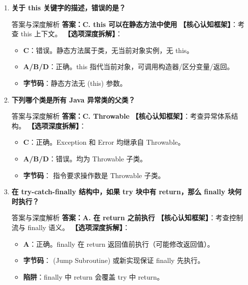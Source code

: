 ﻿\documentclass[12pt, a4paper]{ctexart}
\newcommand{\code}[1]{\texttt{\color{myblue}\detokenize{#1}}}
\begin{document}
\begin{enumerate}[label=\arabic*.]
	\item \textbf{关于 this 关键字的描述，错误的是？}
	      \begin{bluebox}{答案与深度解析}
		      \textbf{答案：C. this 可以在静态方法中使用}
		      \textbf{【核心认知框架】}：考查 this 上下文。
		      \textbf{【选项深度拆解】}：
		      \begin{itemize}[leftmargin=*, nosep]
			      \item \textbf{C}：错误。静态方法属于类，无当前对象实例，无 this。
			      \item \textbf{A/B/D}：正确。this 指代当前对象，可调用构造器/区分变量/返回。
			      \item \textbf{字节码}：静态方法无 \code{aload_0} (this) 参数。
		      \end{itemize}
	      \end{bluebox}

	\item \textbf{下列哪个类是所有 Java 异常类的父类？}
	      \begin{bluebox}{答案与深度解析}
		      \textbf{答案：C. Throwable}
		      \textbf{【核心认知框架】}：考查异常体系结构。
		      \textbf{【选项深度拆解】}：
		      \begin{itemize}[leftmargin=*, nosep]
			      \item \textbf{C}：正确。Exception 和 Error 均继承自 Throwable。
			      \item \textbf{A/B/D}：错误。均为 Throwable 子类。
			      \item \textbf{字节码}：\code{athrow} 指令要求操作数是 Throwable 子类。
		      \end{itemize}
	      \end{bluebox}

	\item \textbf{在 try-catch-finally 结构中，如果 try 块中有 return，那么 finally 块何时执行？}
	      \begin{bluebox}{答案与深度解析}
		      \textbf{答案：A. 在 return 之前执行}
		      \textbf{【核心认知框架】}：考查控制流与 finally 语义。
		      \textbf{【选项深度拆解】}：
		      \begin{itemize}[leftmargin=*, nosep]
			      \item \textbf{A}：正确。finally 在 return 返回值前执行（可能修改返回值）。
			      \item \textbf{字节码}：\code{jsr} (Jump Subroutine) 或新实现保证 finally 先执行。
			      \item \textbf{陷阱}：finally 中 return 会覆盖 try 中 return。
		      \end{itemize}
	      \end{bluebox}


\end{enumerate}
\end{document}

